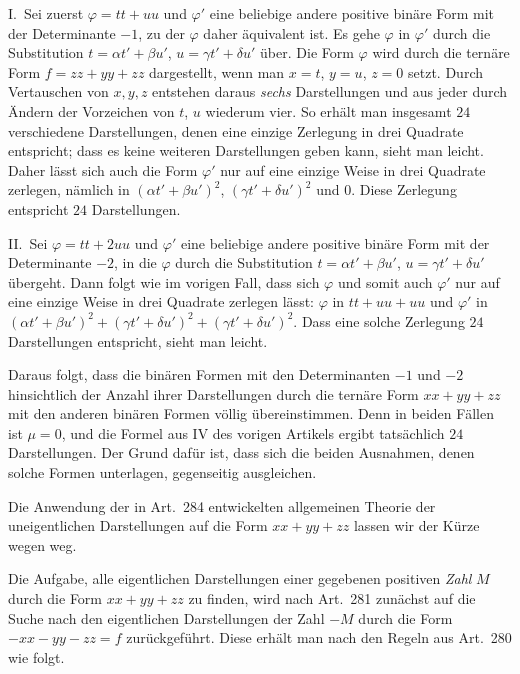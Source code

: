 I.\ Sei zuerst $\varphi=tt+uu$ und $\varphi'$ eine beliebige andere positive
binäre Form mit der Determinante $-1$, zu der $\varphi$ daher
äquivalent ist. Es gehe $\varphi$ in $\varphi'$ durch die Substitution
$t=\alpha t'+\beta u'$, $u=\gamma t'+\delta u'$ über. Die Form $\varphi$ wird durch die ternäre Form $f=zz+yy+zz$
dargestellt, wenn man $x=t$, $y=u$, $z=0$ setzt. Durch Vertauschen
von $x,y,z$ entstehen daraus \textit{sechs} Darstellungen und aus
jeder durch Ändern der Vorzeichen von $t$, $u$ wiederum
vier. So erhält man insgesamt $24$ verschiedene Darstellungen,
denen eine einzige Zerlegung in drei Quadrate entspricht; dass es
keine weiteren Darstellungen geben kann, sieht man leicht. Daher
lässt sich auch die Form $\varphi'$ nur auf eine einzige Weise in
drei Quadrate zerlegen, nämlich in $(\alpha t'+\beta u')^2$, $(\gamma t'+\delta u')^2$ und $0$.
Diese Zerlegung entspricht $24$ Darstellungen.

II.\ Sei $\varphi=tt+2uu$ und $\varphi'$ eine beliebige andere positive binäre
Form mit der Determinante $-2$, in die $\varphi$ durch die
Substitution $t=\alpha t'+\beta u'$, $u=\gamma t'+\delta u'$ übergeht. Dann folgt wie im vorigen
Fall, dass sich $\varphi$ und somit auch $\varphi'$ nur auf eine einzige
Weise in drei Quadrate zerlegen lässt: $\varphi$ in $tt+uu+uu$ und
$\varphi'$ in $(\alpha t'+\beta u')^2+(\gamma t'+\delta u')^2+(\gamma t'+\delta u')^2$. Dass eine solche Zerlegung $24$ Darstellungen
entspricht, sieht man leicht.

Daraus folgt, dass die binären Formen mit den Determinanten $-1$
und $-2$ hinsichtlich der Anzahl ihrer Darstellungen durch die
ternäre Form $xx+yy+zz$ mit den anderen binären Formen völlig übereinstimmen.
Denn in beiden Fällen ist $\mu=0$, und die Formel aus IV des vorigen
Artikels ergibt tatsächlich $24$ Darstellungen. Der Grund dafür
ist, dass sich die beiden Ausnahmen, denen solche Formen unterlagen,
gegenseitig ausgleichen.

Die Anwendung der in Art.\ 284 entwickelten allgemeinen Theorie
der uneigentlichen Darstellungen auf die Form $xx+yy+zz$ lassen wir
der Kürze wegen weg.

Die Aufgabe, alle eigentlichen Darstellungen einer gegebenen positiven
\textit{Zahl} $M$ durch die Form $xx+yy+zz$ zu finden, wird nach
Art.\ 281 zunächst auf die Suche nach den eigentlichen Darstellungen
der Zahl $-M$ durch die Form $-xx-yy-zz=f$ zurückgeführt. Diese erhält
man nach den Regeln aus Art.\ 280 wie folgt.

